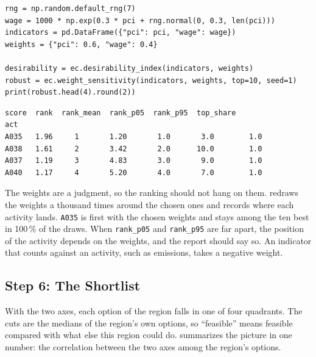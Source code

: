 \begin{lstlisting}
rng = np.random.default_rng(7)
wage = 1000 * np.exp(0.3 * pci + rng.normal(0, 0.3, len(pci)))
indicators = pd.DataFrame({"pci": pci, "wage": wage})
weights = {"pci": 0.6, "wage": 0.4}

desirability = ec.desirability_index(indicators, weights)
robust = ec.weight_sensitivity(indicators, weights, top=10, seed=1)
print(robust.head(4).round(2))
\end{lstlisting}
\begin{lstlisting}[language={}, numbers=none, backgroundcolor=\color{white}, frame=leftline, framerule=2pt, rulecolor=\color{noteborder}, xleftmargin=1.5em]
      score  rank  rank_mean  rank_p05  rank_p95  top_share
act                                                        
A035   1.96     1       1.20       1.0       3.0        1.0
A038   1.61     2       3.42       2.0      10.0        1.0
A037   1.19     3       4.83       3.0       9.0        1.0
A040   1.17     4       5.20       4.0       7.0        1.0
\end{lstlisting}

The weights are a judgment, so the ranking should not hang on
them.  redraws the weights a thousand times
around the chosen ones and records where each activity lands.
\texttt{A035} is first with the chosen weights and stays
among the ten best in 100\,\% of the
draws. When \texttt{rank\_p05} and \texttt{rank\_p95} are far apart, the
position of the activity depends on the weights, and the report should
say so. An indicator that counts against an activity, such as emissions,
takes a negative weight.

\subsection{Step 6: The Shortlist}

With the two axes, each option of the region falls in one of
four quadrants. The cuts are the medians of the region's own options, so
``feasible'' means feasible compared with what else this region could
do.  summarizes the picture in one number:
the correlation between the two axes among the region's options.


